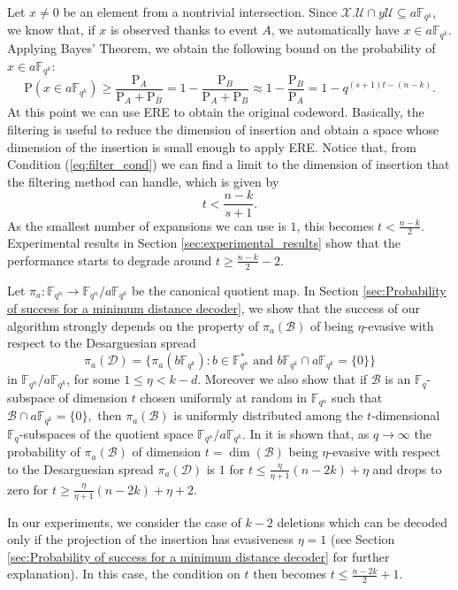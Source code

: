 \documentclass{article}
\newcommand{\F}{\mathbb{F}}
\newcommand{\Fq}{\mathbb{F}_{q}}
\newcommand{\Fqn}{\mathbb{F}_{q^n}}
\newcommand{\Fqk}{\mathbb{F}_{q^k}}
\newcommand{\calB}{\mathcal{B}}
\newcommand{\calD}{\mathcal{D}}
\newcommand{\calU}{\mathcal{U}}
\newcommand{\calX}{\mathcal{X}}
\newcommand{\pr}{\mathrm{P}}
\begin{document}
Let $x \neq 0$ be an element from a nontrivial intersection. Since $\calX.\calU \cap y \calU \subseteq a \Fqk$, we know that, if $x$ is observed thanks to event $A$, we automatically have $x \in a \Fqk$.
Applying Bayes' Theorem, we obtain the following bound on the probability of $x \in a \Fqk$:
\begin{equation}
\label{eq:condition probability for filter}
\pr(x \in a \Fqk) \geq \frac{\pr_A}{\pr_A + \pr_B} =
1 - \frac{\pr_B}{\pr_A+\pr_B} \approx 1-\frac{\pr_B}{\pr_A} = 1 - q^{(s+1)t - (n-k)}.
\end{equation}
At this point we can use ERE to obtain the original codeword.
Basically, the filtering is useful to reduce the dimension of insertion and obtain a space whose dimension of the insertion is small enough to apply ERE.
Notice that, from Condition (\ref{eq:filter_cond}) we can find a limit to the dimension of insertion that the filtering method can handle, which is given by
\begin{equation}
    \label{eq:filter_ins_limit}
    t < \frac{n-k}{s+1}.
\end{equation}
As the smallest number of expansions we can use is $1$, this becomes $t < \frac{n-k}{2}$. Experimental results in Section \ref{sec:experimental_results} show that the performance starts to degrade around $t \geq \frac{n-k}{2} - 2$. 
\par Let $\pi_a\colon\Fqn\to\Fqn/a\Fqk$ be the canonical quotient map. In Section \ref{sec:Probability of success for a minimum distance decoder}, we show that the success of our algorithm strongly depends on the property of $\pi_a(\mathcal{B})$ of being $\eta$-evasive with respect to the Desarguesian spread
\[
\pi_a(\bm{\calD})=\{\pi_a(b\Fqk) \colon b\in\Fqn^*\text{ and } b\Fqk\cap a\Fqk=\{0\}\}
\]
in $\Fqn/a\Fqk$, for some $1\leq \eta<k-d$.
Moreover we also show that if $\calB$ is an $\Fq$-subspace of dimension $t$ chosen uniformly at random in $\Fqn$ such that $\calB\cap a\Fqk=\{0\},$ then $\pi_a(\mathcal{B})$ is uniformly distributed among the $t$-dimensional $\F_q$-subspaces of the quotient space $\Fqn/a\Fqk$. 
In \cite[Remark 5.5]{gruica2024generalised} it is shown that, as $q \to \infty$ the probability of $\pi_a(\calB)$ of dimension $t=\dim(\calB)$ being $\eta$-evasive with respect to the Desarguesian spread $\pi_a(\bm{\calD})$ is $1$ for $t \leq \frac{\eta}{\eta+1}(n-2k)+\eta$ and drops to zero for $t \geq\frac{\eta}{\eta+1}(n-2k)+\eta+ 2.$

In our experiments, we consider the case of $k-2$ deletions which can be decoded only if the projection of the insertion has evasiveness $\eta = 1$ (see Section \ref{sec:Probability of success for a minimum distance decoder} for further explanation).
In this case, the condition on $t$ then becomes $t \leq \frac{n-2k}{2} + 1$.
\end{document}
